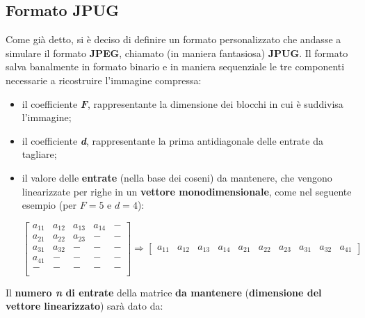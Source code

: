 \subsection{Formato JPUG} \label{subsection:jpug}
    Come già detto, si è deciso di definire un formato personalizzato che andasse a simulare il formato \textbf{JPEG}, chiamato (in maniera fantasiosa) \textbf{JPUG}.
    Il formato salva banalmente in formato binario e in maniera sequenziale le tre componenti necessarie a ricostruire l'immagine compressa:
    \begin{itemize}
        \item il coefficiente \textbf{\textit{F}}, rappresentante la dimensione dei blocchi in cui è suddivisa l'immagine;
        \item il coefficiente \textbf{\textit{d}}, rappresentante la prima antidiagonale delle entrate da tagliare;
        \item il valore delle \textbf{entrate} (nella base dei coseni) da mantenere, che vengono linearizzate per righe in un \textbf{vettore monodimensionale}, come nel seguente esempio (per $F=5$ e $d=4$):

        $$
        \begin{bmatrix}
            a_{11} & a_{12} & a_{13} & a_{14} & - \\
            a_{21} & a_{22} & a_{23} & - & - \\
            a_{31} & a_{32} & - & - & - \\
            a_{41} & - & - & - & - \\
            - & - & - & - & - \\
            \end{bmatrix}
        \Longrightarrow 
        \begin{bmatrix}
            a_{11} & a_{12} & a_{13} & a_{14} & a_{21} & a_{22} & a_{23} & a_{31} & a_{32} & a_{41}
        \end{bmatrix}
        $$
    \end{itemize}
    Il \textbf{numero \textit{n} di entrate} della matrice \textbf{da mantenere} (\textbf{dimensione del vettore linearizzato}) sarà dato da:
